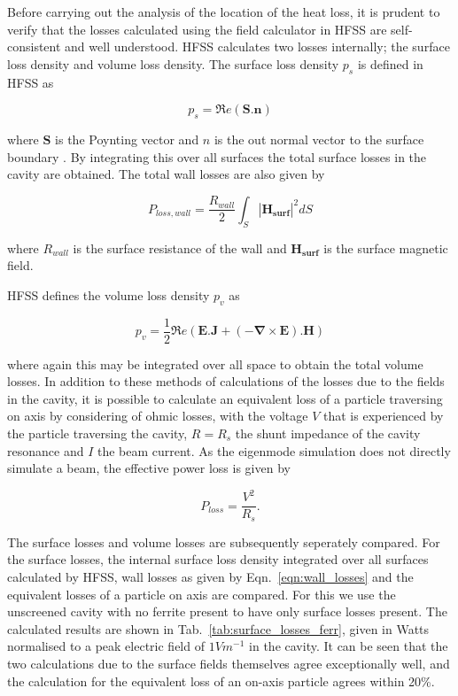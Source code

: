 Before carrying out the analysis of the location of the heat loss, it is prudent to verify that the losses calculated using the field calculator in HFSS are self-consistent and well understood. HFSS calculates two losses internally; the surface loss density and volume loss density. The surface loss density $p_{s}$ is defined in HFSS as

\begin{equation}
p_{s} = \Re{}e \left( \mathbf{S}.\mathbf{n} \right)
\end{equation}

where $\mathbf{S}$ is the Poynting vector and $n$ is the out normal vector to the surface boundary \cite{hfss}. By integrating this over all surfaces the total surface losses in the cavity are obtained. The total wall losses are also given by 

\begin{equation}
P_{loss, wall} = \frac{R_{wall}}{2} \int_{S} \left| \mathbf{H_{surf}} \right|^{2} dS
\label{eqn:wall_losses}
\end{equation}

where $R_{wall}$ is the surface resistance of the wall and $\mathbf{H_{surf}}$ is the surface magnetic field.

HFSS defines the volume loss density $p_{v}$ as 

\begin{equation}
p_{v}=\frac{1}{2}\Re{}e\left( \mathbf{E}.\mathbf{J} + \left( -\mathbf{\nabla} \times \mathbf{E} \right).\mathbf{H} \right) 
\label{eqn:vol_loss_density}
\end{equation}

where again this may be integrated over all space to obtain the total volume losses. In addition to these methods of calculations of the losses due to the fields in the cavity, it is possible to calculate an equivalent loss of a particle traversing on axis by considering of ohmic losses, with the voltage $V$ that is experienced by the particle traversing the cavity, $R = R_{s}$ the shunt impedance of the cavity resonance and $I$ the beam current. As the eigenmode simulation does not directly simulate a beam, the effective power loss is given by 

\begin{equation}
P_{loss} = \frac{V^{2}}{R_{s}}.
\end{equation}

The surface losses and volume losses are subsequently seperately compared. For the surface losses, the internal surface loss density integrated over all surfaces calculated by HFSS, wall losses as given by Eqn.~\ref{eqn:wall_losses} and the equivalent losses of a particle on axis are compared. For this we use the unscreened cavity with no ferrite present to have only surface losses present. The calculated results are shown in Tab.~\ref{tab:surface_losses_ferr}, given in Watts normalised to a peak electric field of $1 V m^{-1}$ in the cavity. It can be seen that the two calculations due to the surface fields themselves agree exceptionally well, and the calculation for the equivalent loss of an on-axis particle agrees within 20\%. 

